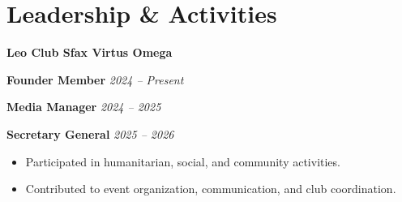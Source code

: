 \documentclass[a4paper,10pt]{article}
\begin{document}

\section*{Leadership \& Activities}

\noindent
\textbf{Leo Club Sfax Virtus Omega}


\textbf{Founder Member} \hfill \textit{2024 -- Present}


\textbf{Media Manager} \hfill \textit{2024 -- 2025}


\textbf{Secretary General} \hfill \textit{2025 -- 2026}

\begin{itemize}[
    leftmargin=*,
    noitemsep,
    topsep=0pt,
    partopsep=0pt,
    parsep=0pt
]

    \item Participated in humanitarian, social, and community activities.

    \item Contributed to event organization, communication, and club coordination.

\end{itemize}


\end{document}
